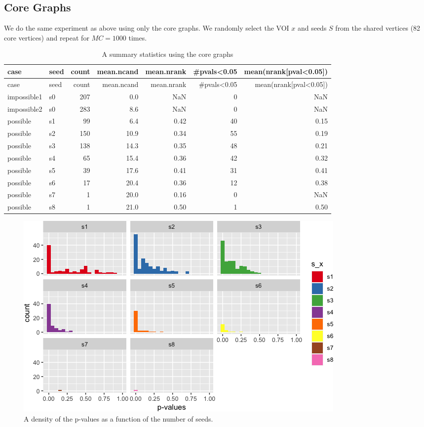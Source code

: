 \documentclass[
]{article}
\begin{document}
\hypertarget{core-graphs}{%
\subsection{Core Graphs}\label{core-graphs}}

We do the same experiment as above using only the core graphs. We
randomly select the VOI \(x\) and seeds \(S\) from the shared vertices
(82 core vertices) and repeat for \(MC=1000\) times.

\begin{longtable}[]{@{}llrrrrr@{}}
\caption{A summary statistics using the core graphs}\tabularnewline
\toprule
case & seed & count & mean.ncand & mean.nrank & \#pvals\textless0.05 &
mean(nrank{[}pval\textless0.05{]})\tabularnewline
\midrule
\endfirsthead
\toprule
case & seed & count & mean.ncand & mean.nrank & \#pvals\textless0.05 &
mean(nrank{[}pval\textless0.05{]})\tabularnewline
\midrule
\endhead
impossible1 & s0 & 207 & 0.0 & NaN & 0 & NaN\tabularnewline
impossible2 & s0 & 283 & 8.6 & NaN & 0 & NaN\tabularnewline
possible & s1 & 99 & 6.4 & 0.42 & 40 & 0.15\tabularnewline
possible & s2 & 150 & 10.9 & 0.34 & 55 & 0.19\tabularnewline
possible & s3 & 138 & 14.3 & 0.35 & 48 & 0.21\tabularnewline
possible & s4 & 65 & 15.4 & 0.36 & 42 & 0.32\tabularnewline
possible & s5 & 39 & 17.6 & 0.41 & 31 & 0.41\tabularnewline
possible & s6 & 17 & 20.4 & 0.36 & 12 & 0.38\tabularnewline
possible & s7 & 1 & 20.0 & 0.16 & 0 & NaN\tabularnewline
possible & s8 & 1 & 21.0 & 0.50 & 1 & 0.50\tabularnewline
\bottomrule
\end{longtable}

\begin{figure}
\centering
\includegraphics{vn_files/figure-latex/pval-1.png}
\caption{A density of the p-values as a function of the number of
seeds.}
\end{figure}
\end{document}
